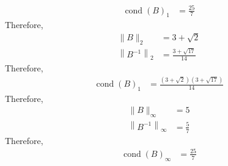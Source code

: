 \documentclass[fleqn, a4paper, 11pt, oneside]{amsart}
\theoremstyle{definition}
\theoremstyle{theorem}
\DeclareMathOperator{\cond}{cond}
\begin{document}
\begin{solution}
\begin{align*}
		\cond(B)_1 & = \frac{25}{7}
	\end{align*}
	Therefore,
	\begin{align*}
		\|B\|_2                   & = 3 + \sqrt{2} \\
		\left\| B^{-1} \right\|_2 & = \frac{3 + \sqrt{17}}{14}
	\end{align*}
	Therefore,
	\begin{align*}
		\cond(B)_1 & = \frac{\left( 3 + \sqrt{2} \right) \left( 3 + \sqrt{17} \right)}{14}
	\end{align*}
	Therefore,
	\begin{align*}
		\|B\|_{\infty}                   & = 5 \\
		\left\| B^{-1} \right\|_{\infty} & = \frac{5}{7}
	\end{align*}
	Therefore,
	\begin{align*}
		\cond(B)_{\infty} & = \frac{25}{7}
	\end{align*}
\end{solution}
\end{document}
